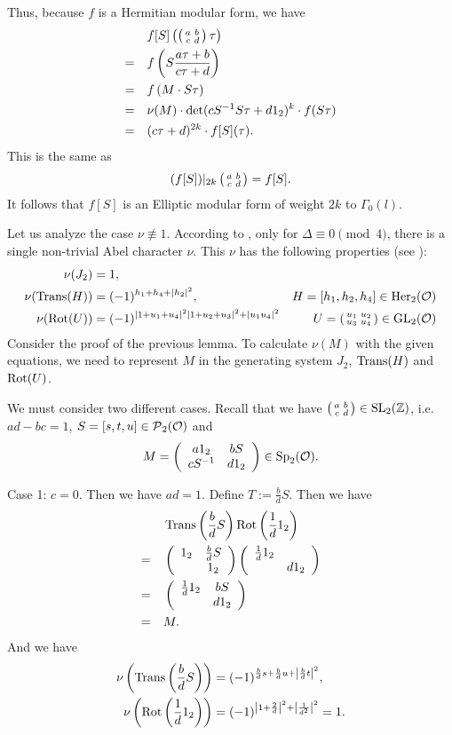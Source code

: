 \begin{lemma}
Thus, because $f$ is a Hermitian modular form, we have
\begin{align*}
& f[S] \left(\left( \begin{smallmatrix} a & b \\ c & d \end{smallmatrix} \right) \tau\right) \\
=\quad & f\left(S \frac{a \tau + b}{c \tau + d} \right) \\
=\quad & f\left( M \cdot S \tau \right) \\
=\quad & \nu(M) \cdot \det(c S^{-1} S \tau + d 1_2)^k \cdot f(S \tau) \\
=\quad & (c \tau + d)^{2k} \cdot f[S](\tau) .
\end{align*}
This is the same as
\[ (f[S]) |_{2k} \left( \begin{smallmatrix} a & b \\ c & d \end{smallmatrix} \right) = f[S] . \]
It follows that $f[S]$ is an Elliptic modular form of weight $2k$ to $\Gamma_0(l)$.
\endproof
\end{lemma}


\begin{remark}\label{remark-nu}
Let us analyze the case $\nu \not\equiv 1$. According to \cite{Dern01Herm}, only for $\Delta \equiv 0 \pmod{4}$, there is a single non-trivial Abel character $\nu$. This $\nu$ has the following properties (see \cite{Dern01Herm}):
\begin{align*}
\nu(J_2) & = 1 , \\
\nu(\operatorname{Trans}(H)) & = (-1)^{h_1 + h_4 + |h_2|^2}, & H = [h_1, h_2, h_4] \in \operatorname{Her}_2(\mathcal{O}) \\
\nu(\operatorname{Rot}(U)) & = (-1)^{|1+u_1+u_4|^2 |1+u_2+u_3|^2 + |u_1 u_4|^2} & U = \left( \begin{smallmatrix} u_1 & u_2 \\ u_3 & u_4 \end{smallmatrix} \right) \in \operatorname{GL}_2(\mathcal{O})
\end{align*}
Consider the proof of the previous lemma. To calculate $\nu(M)$ with the given equations, we need to represent $M$ in the generating system $J_2$, $\operatorname{Trans}(H)$ and $\operatorname{Rot}(U)$.

We must consider two different cases. Recall that we have $\left( \begin{smallmatrix} a & b \\ c & d \end{smallmatrix} \right) \in \operatorname{SL}_2(\mathbb{Z})$, i.e. $ad - bc = 1$, $S = [s,t,u] \in \operatorname{\mathcal{P}}_2(\mathcal{O})$ and
\[ M = \left( \begin{array}{cc} a 1_2 & b S \\ c S^{-1} & d 1_2 \end{array} \right) \in \operatorname{Sp}_2(\mathcal{O}) . \]

Case 1: $c=0$. Then we have $ad=1$. Define $T := \frac{b}{d} S$. Then we have
\begin{align*}
& \operatorname{Trans}\left(\frac{b}{d} S\right) \operatorname{Rot}\left(\frac{1}{d} 1_2\right) \\
=\quad &
\left( \begin{array}{cc} 1_2 & \frac{b}{d} S \\  & 1_2 \end{array} \right)
\left( \begin{array}{cc} \frac{1}{d} 1_2 &  \\  & d 1_2 \end{array} \right) \\
=\quad &
\left( \begin{array}{cc} \frac{1}{d}1_2 & b S \\  & d 1_2 \end{array} \right) \\
=\quad& M .
\end{align*}
And we have
\begin{align*}
\nu\left(\operatorname{Trans}\left(\frac{b}{d} S\right)\right) & = (-1)^{\frac{b}{d}s + \frac{b}{d}u + \left|\frac{b}{d} t \right|^2}, \\
\nu\left(\operatorname{Rot}\left(\frac{1}{d} 1_2\right)\right) & = (-1)^{\left|1 + \frac{2}{d}\right|^2 + \left|\frac{1}{d^2}\right|^2} = 1 .
\end{align*}


\end{remark}
